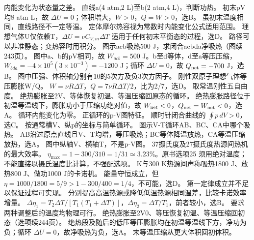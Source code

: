 \crosscheck 内能变化为状态量之差。
\problemtext 直线a(4 atm,2 L)至b(2 atm,4 L)，判断功热。
\workings 初末pV均8 atm L，故 $\Delta U=0$；体积增大，$W>0$，$Q=W>0$，选B。
\crosscheck 虽初末温度相同，直线路径不一定等温。
\problemtext 定体摩尔热容视为常数时内能变化公式适用范围。
\workings 理想气体U仅依赖T，$\Delta U=\nu C_{V,m}\Delta T$ 适用于任何初末平衡态的过程，选D。
\crosscheck 路径可以非准静态；变热容时用积分。
\problemtext 图示acb吸热500 J，求闭合acbda净吸热（图续243页）。
\workings 图中a、b的pV相同，故 $W_{acb}=500$ J。b至d等体，d至a等压压缩，$W_{bda}=-4\times10^5(3\times10^{-3})=-1200$ J；循环 $\Delta U=0$，故 $Q_{\rm net}=-700$ J，选B。
\crosscheck 图中压强、体积轴分别有10的5次方及负3次方因子。
\problemtext 刚性双原子理想气体等压膨胀W/Q。
\workings $W=\nu R\Delta T$，$Q=7\nu R\Delta T/2$，比为2/7，选D。
\crosscheck 取常温刚性五自由度。
\problemtext 绝热膨胀至2V、等体恢复初温、等温压缩回原态的循环。
\workings 绝热膨胀路径位于初温等温线下，膨胀功小于压缩功绝对值，故 $W_{\rm net}<0$，$Q_{\rm net}=W_{\rm net}<0$，选A。
\crosscheck 循环内能变化为零。
\problemtext 正循环的p-V图特征。
\workings 顺时针闭合曲线的 $\oint p\,dV>0$，选C。
\crosscheck 按通常横V、纵p的坐标与简单循环。
\problemtext 图示V-T循环AB、BC、CA中哪个吸热。
\workings AB沿过原点直线且V、T均增，等压吸热；BC等体降温放热，CA等温压缩放热，选A。
\crosscheck 图中纵轴V、横轴T，不是p-V图。
\problemtext 37摄氏度及27摄氏度热源间热机的最大效率。
\workings $\eta_{\max}=1-300/310=1/31\simeq3.23\%$。原书选项25%
\crosscheck 须用绝对温度；不能直接以摄氏温度比计算，不强配选项。
 K与300 K热源间声称吸热1800 J、放热800 J、做功1000 J的卡诺机。
\workings 能量守恒成立，但 $\eta=1000/1800=5/9>1-300/400=1/4$，不可能，选D。
\crosscheck 第一定律成立并不足以保证过程可实现。
\problemtext 分别提高高温热源或降低低温热源相同温差，比较卡诺效率增量。
\workings $\Delta\eta_1=T_2\Delta T/[T_1(T_1+\Delta T)]$，$\Delta\eta_2=\Delta T/T_1$，前者较小，选B。
\crosscheck 要求两种调整后的温度均物理可行。
\problemtext 绝热膨胀至2V0、等压恢复初温、等温压缩回初态（选项续244页）。
\workings 绝热段及随后的低压等压膨胀均在初温等温线下方，净功为负；循环 $\Delta U=0$，故净吸热为负，选A。
\crosscheck 末等温压缩从更大体积回初体积。
